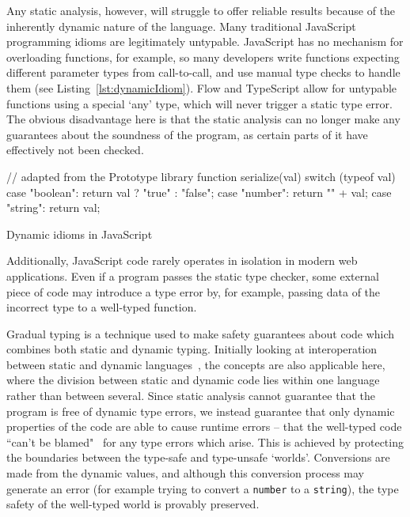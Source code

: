 \documentclass[12pt,a4paper,twoside,openright]{report}
\theoremstyle{definition}
\theoremstyle{dotless}
\begin{document}
Any static analysis, however, will struggle to offer reliable results because
of the inherently dynamic nature of the language. Many traditional JavaScript
programming idioms are legitimately untypable. JavaScript has no
mechanism for overloading functions, for example, so many developers write
functions expecting different parameter types from call-to-call, and use manual
type checks to handle them (see Listing~\ref{lst:dynamicIdiom}). Flow and
TypeScript allow for untypable functions using a special `any' type, which will
never trigger a static type error. The obvious disadvantage here is that the
static analysis can no longer make any guarantees about the soundness of the
program, as certain parts of it have effectively not been checked.
\begin{listing}[t]
  \begin{jscript}
 	// adapted from the Prototype library
 	function serialize(val) {
	  switch (typeof val) {
		case "boolean":
		return val ? "true" : "false";
		case "number":
		return "" + val;
		case "string":
		return val;
	  }
 	}	
  \end{jscript}
  \caption{Dynamic idioms in JavaScript}
  \label{lst:dynamicIdiom}
\end{listing}
Additionally, JavaScript code rarely operates in isolation in modern web
applications. Even if a program passes the static type checker, some external
piece of code may introduce a type error by, for example, passing data of the
incorrect type to a well-typed function.

Gradual typing is a technique used to make safety guarantees about code which
combines both static and dynamic typing. Initially looking at interoperation
between static and dynamic languages~\cite{gray2005fine}, the concepts are
also applicable here, where the division between static and dynamic code lies
within one language rather than between several. Since static analysis cannot
guarantee that the program is free of dynamic type errors, we instead
guarantee that only dynamic properties of the code are able to cause runtime
errors -- that the well-typed code ``can't be blamed"~\cite{cantblame} for
any type errors which arise. This is achieved by protecting the boundaries
between the type-safe and type-unsafe `worlds'. Conversions are made from the
dynamic values, and although this conversion process may
generate an error (for example trying to convert a \texttt{number} to a
\texttt{string}), the type safety of the well-typed world is provably
preserved.
\end{document}
